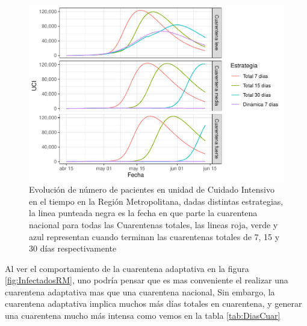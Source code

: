 \documentclass[]{article}
\begin{document}
\begin{figure}
\centering
\includegraphics{Informe_Mesa_2020_04_16_files/figure-latex/UCIRM-1.pdf}
\caption{\label{fig:UCIRM}Evolución de número de pacientes en unidad de Cuidado Intensivo en el tiempo en la Región Metropolitana, dadas distintas estrategias, la linea punteada negra es la fecha en que parte la cuarentena nacional para todas las Cuarentenas totales, las lineas roja, verde y azul representan cuando terminan las cuarentenas totales de 7, 15 y 30 días respectivamente}
\end{figure}

Al ver el comportamiento de la cuarentena adaptativa en la figura \ref{fig:InfectadosRM}, uno podría pensar que es mas conveniente el realizar una cuarentena adaptativa mas que una cuarentena nacional, Sin embargo, la cuarentena adaptativa implica muchos más días totales en cuarentena, y generar una cuarentena mucho más intensa como vemos en la tabla \ref{tab:DiasCuar}
\end{document}
